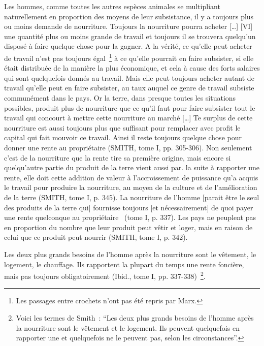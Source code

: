 \documentclass[french,twoside]{book} %
\newenvironment{quoteblock}%
  {\begin{quoting}}
  {\end{quoting}}
\newenvironment{quotebar}{%
    \def\FrameCommand{{\color{rubric!10!}\vrule width 0.5em} \hspace{0.9em}}%
    \def\OuterFrameSep{\itemsep} %
    \MakeFramed {\advance\hsize-\width \FrameRestore}
  }%
  {%
    \endMakeFramed
  }
\renewenvironment{quoteblock}%
  {%
    \savenotes
    \setstretch{0.9}
    \normalfont
    \begin{quotebar}
  }
  {%
    \end{quotebar}
    \spewnotes
  }
\begin{document}
\begin{quoteblock}
 \noindent Les hommes, comme toutes les autres espèces animales se multipliant naturellement en proportion des moyens de leur subsistance, il y a toujours plus ou moins demande de nourriture. Toujours la nourriture pourra acheter […] [VI] une quantité plus ou moins grande de travail et toujours il se trouvera quelqu’un disposé à faire quelque chose pour la gagner. A la vérité, ce qu’elle peut acheter de travail n’est pas toujours égal \footnote{Les passages entre crochets n’ont pas été repris par Marx.} à ce qu’elle pourrait en faire subsister, si elle était distribuée de la manière la plus économique, et cela à cause des forts salaires qui sont quelquefois donnés au travail. Mais elle peut toujours acheter autant de travail qu’elle peut en faire subsister, au taux auquel ce genre de travail subsiste communément dans le pays. Or la terre, dans presque toutes les situations possibles, produit plus de nourriture que ce qu’il faut pour faire subsister tout le travail qui concourt à mettre cette nourriture au marché […] Te surplus de cette nourriture est aussi toujours plus que suffisant pour remplacer avec profit le capital qui fait mouvoir ce travail. Ainsi il reste toujours quelque chose pour donner une rente au propriétaire (SMITH, tome I, pp. 305-306). Non seulement c’est de la nourriture que la rente tire sa première origine, mais encore si quelqu’autre partie du produit de la terre vient aussi par. la suite à rapporter une rente, elle doit cette addition de valeur à l’accroissement de puissance qu’a acquis le travail pour produire la nourriture, au moyen de la culture et de l’amélioration de la terre (SMITH, tome I, p. 345). La nourriture de l’homme [parait être le seul des produits de la terre qui] fournisse toujours [et nécessairement] de quoi payer une rente quelconque au propriétaire  (tome I, p. 337). Les pays ne peuplent pas en proportion du nombre que leur produit peut vêtir et loger, mais en raison de celui que ce produit peut nourrir (SMITH, tome I, p. 342).\par
 Les deux plus grands besoins de l’homme après la nourriture sont le vêtement, le logement, le chauffage. Ils rapportent la plupart du temps une rente foncière, mais pas toujours obligatoirement (Ibid., tome I, pp. 337-338) \footnote{Voici les termes de Smith : “Les deux plus grands besoins de l’homme après la nourriture sont le vêtement et le logement. Ils peuvent quelquefois en rapporter une et quelquefois ne le peuvent pas, selon les circonstances”.}.
 \end{quoteblock}
\end{document}
